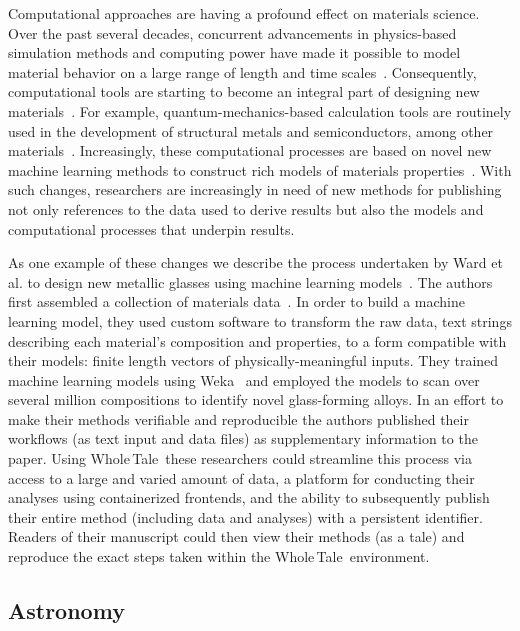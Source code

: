 \documentclass[review]{elsarticle}
\newcommand{\wt}{Whole\,Tale}
\begin{document}
Computational approaches are having a profound effect on materials science. 
Over the past several decades, concurrent advancements in physics-based simulation methods and 
computing power have made it possible to model material behavior on a large range of length and
time scales~\cite{yip07handbook}. Consequently, computational tools are starting to become an integral part
of designing new materials~\cite{council04accelerating}. For example, quantum-mechanics-based calculation tools 
are routinely used in the development of structural metals and semiconductors, among other materials~\cite{curtarolo13high}. 
Increasingly, these computational processes are based on novel new machine
learning methods to construct rich models of materials properties~\cite{hill16materials, ward16materials, rajan05materials}. 
With such changes, researchers are increasingly in need of new methods
for publishing not only references to the data used to derive results
but also the models and computational processes that underpin results. 
 
As one example of these changes we describe the process undertaken by Ward
et al. to design new metallic glasses using machine learning models~\cite{ward16materials}. The authors first assembled a collection of materials data~\cite{kawazoe97phase}. In order to build 
a machine learning model, they used custom software to transform the raw data, text strings describing each material’s composition and properties, to a form compatible with their models: finite length vectors of physically-meaningful inputs. They trained machine learning models using Weka~\cite{hall09weka} and employed the models to scan over several million compositions to identify novel glass-forming alloys. 
In an effort to make their methods verifiable and reproducible the authors published their workflows (as text input and data files) as supplementary information to the paper. Using \wt\ these researchers could streamline this process via access to a large and varied amount of data, a platform for conducting their analyses
using containerized frontends, and the ability to subsequently publish their entire method (including data and analyses) with a persistent identifier. Readers of their
manuscript could then view their methods (as a tale) and reproduce the
exact steps taken within the \wt\ environment. 



\subsection{Astronomy}
\end{document}
